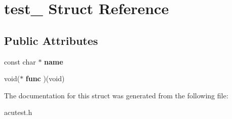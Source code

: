 \hypertarget{structtest__}{}\section{test\+\_\+ Struct Reference}
\label{structtest__}
\subsection*{Public Attributes}
\begin{DoxyCompactItemize}
\item 
const char $\ast$ {\bfseries name}\hypertarget{structtest___a66f019bc038805eb94c89cfaf683cc2a}{}\label{structtest___a66f019bc038805eb94c89cfaf683cc2a}

\item 
void($\ast$ {\bfseries func} )(void)\hypertarget{structtest___a8d19f115e1afe787a71465f386101638}{}\label{structtest___a8d19f115e1afe787a71465f386101638}

\end{DoxyCompactItemize}


The documentation for this struct was generated from the following file\+:\begin{DoxyCompactItemize}
\item 
acutest.\+h\end{DoxyCompactItemize}
